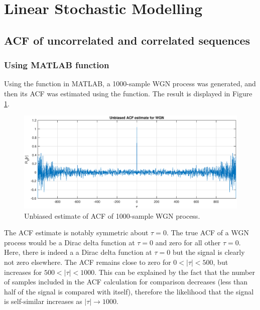
\section{Linear Stochastic Modelling}

\subsection{ACF of uncorrelated and correlated sequences}


\subsubsection{Using MATLAB \textbf{} function}

Using the  function in MATLAB, a 1000-sample WGN process was generated, and then its ACF was estimated using the  function. The result is displayed in Figure \ref{fig:acf_est}.

\begin{figure}[H]
    \centering
    \includegraphics[width=14cm]{assignment2figs/acfest.eps}
    \caption{Unbiased estimate of ACF of 1000-sample WGN  process.}
    \label{fig:acf_est}
\end{figure}

\noindent
The ACF estimate is notably symmetric about $\tau=0$. The true ACF of a WGN process would be a Dirac delta function at $\tau=0$ and zero for all other $\tau=0$. Here, there is indeed a a Dirac delta function at $\tau=0$ but the signal is clearly not zero elsewhere. The ACF remains close to zero for $0<|\tau|<500$, but increases for $500<|\tau|<1000$. This can be explained by the fact that the number of samples included in the ACF calculation for comparison decreases (less than half of the signal is compared with itself), therefore the likelihood that the signal is self-similar increases as $|\tau| \rightarrow 1000$.

